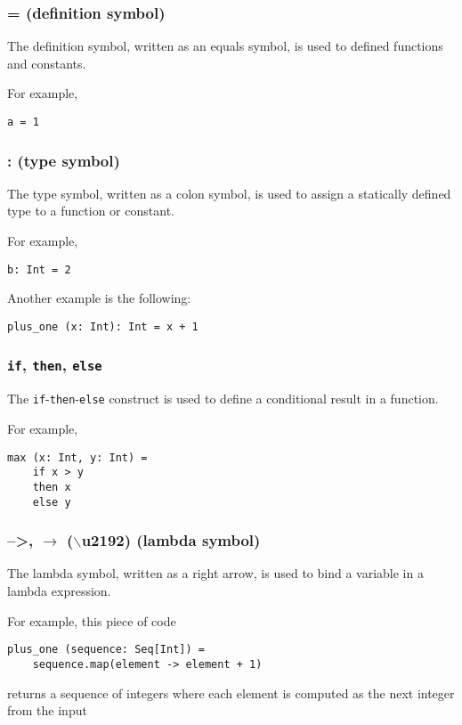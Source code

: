 \documentclass[12pt,a4paper]{article}
\newcommand{\srccode}[1]{\texttt{{#1}}}
\newcommand{\reservedWord}[1]{{\color{blue}\srccode{#1}}\xspace}
\newcommand{\sif}{\reservedWord{if}}
\newcommand{\sthen}{\reservedWord{then}}
\newcommand{\selse}{\reservedWord{else}}
\newcommand{\lambdaSymbol}{{\tiny--\textgreater}}
\begin{document}
    \subsubsection{= (definition symbol)}

    The definition symbol, written as an equals symbol, is used to defined functions and constants.

    For example,
    \begin{lstlisting}[label={lst:exampleDef}]
  a = 1
    \end{lstlisting}

    \subsubsection{: (type symbol)}

    The type symbol, written as a colon symbol, is used to assign a statically defined type to a function or constant.

    For example,
    \begin{lstlisting}[label={lst:exampleType01}]
  b: Int = 2
    \end{lstlisting}

    Another example is the following:
    \begin{lstlisting}[label={lst:exampleType02}]
  plus_one (x: Int): Int = x + 1
    \end{lstlisting}

    \subsubsection{\sif, \sthen, \selse}

    The \sif-\sthen-\selse construct is used to define a conditional result in a function.

    For example,
    \begin{lstlisting}[label={lst:exampleIfThenElse}]
  max (x: Int, y: Int) =
    if x > y
    then x
    else y
    \end{lstlisting}

    \subsubsection{\lambdaSymbol, $\rightarrow$ ($\backslash$u2192) (lambda symbol)}

    The lambda symbol, written as a right arrow, is used to bind a variable in a lambda expression.

    For example, this piece of code
    \begin{lstlisting}[label={lst:exampleLambda}]
  plus_one (sequence: Seq[Int]) =
    sequence.map(element -> element + 1)
    \end{lstlisting}
    returns a sequence of integers where each element is computed as the next integer from the input
\end{document}
